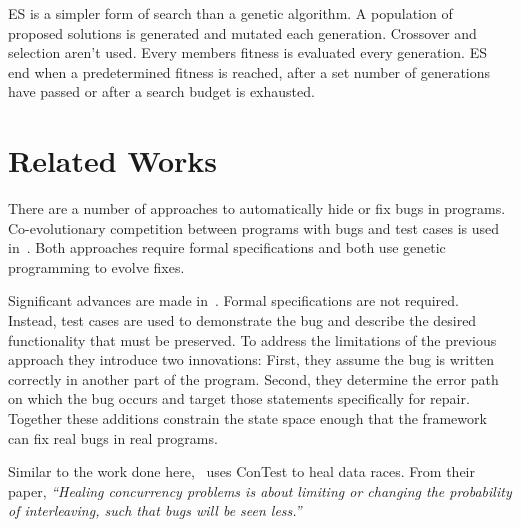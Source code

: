 \documentclass{llncs}
\begin{document}
ES is a simpler form of search than a genetic algorithm. A population of
proposed solutions is generated and mutated each generation. Crossover and
selection aren't used. Every members fitness is evaluated every generation. ES
end when a predetermined fitness is reached, after a set number of
generations have passed or after a search budget is exhausted.


\section{Related Works}
\label{sec:related_works}

There are a number of approaches to automatically hide or fix bugs in programs.
Co-evolutionary competition between programs with bugs and test cases is used
in~\cite{AY08, Arc08, WT10}. Both approaches require formal specifications and
both use genetic programming to evolve fixes.

Significant advances are made in~\cite{FNWG09, WNLF09, NWLF09, WFGN10,
GNFW11}. Formal specifications are not required. Instead, test cases are
used to demonstrate the bug and describe the desired functionality that must be
preserved. To address the limitations of the previous approach they introduce
two innovations: First, they assume the bug is written correctly in another
part of the program. Second, they determine the error path on which the bug
occurs and target those statements specifically for repair. Together these
additions constrain the state space enough that the framework can fix real bugs
in real programs.

Similar to the work done here,~\cite{KLT+07, LVK08} uses ConTest to heal data
races. From their paper, \textit{``Healing concurrency problems is about
limiting or changing the probability of interleaving, such that bugs will be
seen less.''}
\end{document}
